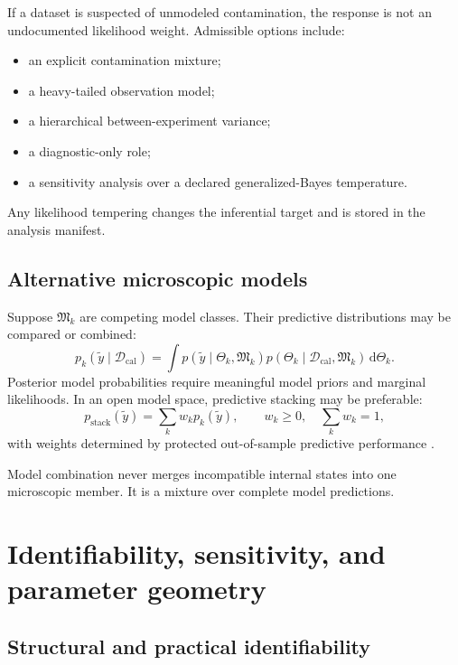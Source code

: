 \documentclass[11pt]{article}
\newcommand{\dd}{\mathrm{d}}
\newcommand{\caldata}{\mathcal D_{\mathrm{cal}}}
\begin{document}
If a dataset is suspected of unmodeled contamination, the response is not an
undocumented likelihood weight.  Admissible options include:
\begin{itemize}
\item an explicit contamination mixture;
\item a heavy-tailed observation model;
\item a hierarchical between-experiment variance;
\item a diagnostic-only role;
\item a sensitivity analysis over a declared generalized-Bayes temperature.
\end{itemize}
Any likelihood tempering changes the inferential target and is stored in the
analysis manifest.

\subsection{Alternative microscopic models}

Suppose \(\mathfrak M_k\) are competing model classes.  Their predictive
distributions may be compared or combined:
\begin{equation}
 p_k(\widetilde y\mid\caldata)
 =
 \int p(\widetilde y\mid\Theta_k,\mathfrak M_k)
 p(\Theta_k\mid\caldata,\mathfrak M_k)\,\dd\Theta_k.
 \label{eq:model-predictive}
\end{equation}
Posterior model probabilities require meaningful model priors and marginal
likelihoods.  In an open model space, predictive stacking may be preferable:
\begin{equation}
 p_{\mathrm{stack}}(\widetilde y)
 =
 \sum_k w_k p_k(\widetilde y),
 \qquad
 w_k\geq0,\quad\sum_kw_k=1,
 \label{eq:stacking-mixture}
\end{equation}
with weights determined by protected out-of-sample predictive performance
\cite{YaoStacking2018}.

Model combination never merges incompatible internal states into one
microscopic member.  It is a mixture over complete model predictions.

\section{Identifiability, sensitivity, and parameter geometry}
\label{sec:identifiability}

\subsection{Structural and practical identifiability}
\end{document}
